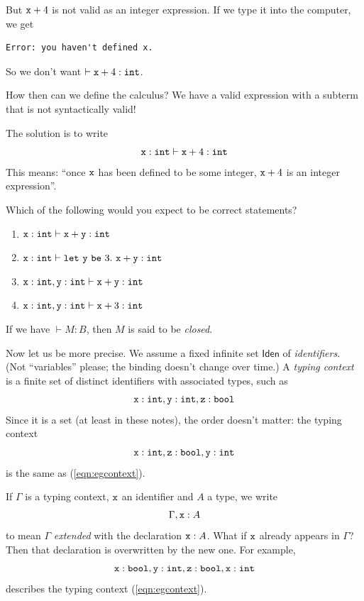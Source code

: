 \documentclass[runningheads,12pt]{llncs}
\newcommand{\ttletmac}[2]{\mathtt{let}\ {#2}\ \mathtt{be}\ {#1}.\ }
\newcommand{\iden}{\mathsf{Iden}}
\begin{document}
But $\mathtt{x} + 4$ is not valid as an integer expression. If we type it into the computer, we get
\begin{verbatim}
Error: you haven't defined x.
\end{verbatim}
So we don't want $\vdash \mathtt{x} + 4 : \mathtt{int}$.

How then can we define the calculus?  We have a valid expression with a subterm that is not syntactically valid!

The solution is to write
\begin{displaymath}
  \mathtt{x}:\mathtt{int} \vdash \mathtt{x} + 4 : \mathtt{int}
\end{displaymath}
This means: ``once $\mathtt{x}$ has been defined to be some integer, $\mathtt{x} + 4$ is an integer expression''.  

\begin{exercise}
Which of the following would you expect to be correct statements?
\begin{enumerate}
\item $\mathtt{x}:\mathtt{int} \vdash \mathtt{x}+\mathtt{y}:\mathtt{int}$
\item $\ttx: \ttint \vdash \ttletmac{ 3 }{ \tty } \ttx+\tty: \ttint$
\item $\mathtt{x}:\mathtt{int},\mathtt{y}:\mathtt{int} \vdash \mathtt{x}+\mathtt{y}: \mathtt{int}$
\item $\mathtt{x}:\mathtt{int},\mathtt{y}:\mathtt{int} \vdash \mathtt{x}+3:\mathtt{int}$
\end{enumerate}
\end{exercise}

If we have $\vdash M : B$, then $M$ is said to be \emph{closed}.

Now let us be more precise.  We assume a fixed infinite set $\iden$ of \emph{identifiers}.  (Not ``variables'' please; the binding doesn't change over time.)  A \emph{typing context} is a finite set of distinct identifiers with associated types, such as
  \begin{equation}  \label{eqn:egcontext}
\mathtt{x}:\mathtt{int}, \mathtt{y}:\mathtt{int}, \mathtt{z}:\mathtt{bool}
\end{equation}
Since it is a set (at least in these notes), the order doesn't matter: the typing context
\begin{displaymath}
  \mathtt{x}:\mathtt{int}, \mathtt{z}:\mathtt{bool}, \mathtt{y}:\mathtt{int}
\end{displaymath}
is the same as (\ref{eqn:egcontext}).

If $\Gamma$ is a typing context, $\mathtt{x}$ an identifier and $A$ a type, we write
  \begin{displaymath}
    \Gamma, \mathtt{x}:A
  \end{displaymath}
to mean $\Gamma$ \emph{extended} with the declaration $\mathtt{x}:A$.  What if $\mathtt{x}$ already appears in $\Gamma$?  Then that declaration is overwritten by the new one.   For example, 
\begin{displaymath}
  \mathtt{x}:\mathtt{bool},  \mathtt{y}: \mathtt{int}, \mathtt{z}:\mathtt{bool}, \mathtt{x}:\mathtt{int}
\end{displaymath}
describes the typing context (\ref{eqn:egcontext}).
\end{document}
